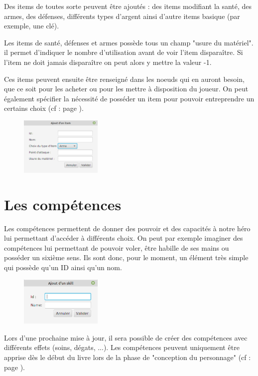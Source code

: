 		Des items de toutes sorte peuvent être ajoutés : des items modifiant la santé, des armes, des défenses, différents types d'argent ainsi d'autre items basique (par exemple, une clé).

		Les items de santé, défenses et armes possède tous un champ "usure du matériel". il permet d'indiquer le nombre d'utilisation avant de voir l'item disparaître. Si l'item ne doit jamais disparaître on peut alors y mettre la valeur -1.

		Ces items peuvent ensuite être renseigné dans les noeuds qui en auront besoin, que ce soit pour les acheter ou pour les mettre à disposition du joueur. On peut également spécifier la nécessité de posséder un item pour pouvoir entreprendre un certains choix (cf :  page \pageref{sec:prerequis}).

		\begin{figure}[H]
			\centering\includegraphics[width=0.35\textwidth, keepaspectratio]{img/itemDialog.png}
		\end{figure}

	\section{Les compétences}
		\label{sec:skills}

		Les compétences permettent de donner des pouvoir et des capacités à notre héro lui permettant d'accéder à différents choix. On peut par exemple imaginer des compétences lui permettant de pouvoir voler, être habille de ses mains ou posséder un sixième sens. Ils sont donc, pour le moment, un élément très simple qui possède qu'un ID ainsi qu'un nom.

		\begin{figure}[H]
			\centering\includegraphics[width=0.35\textwidth, keepaspectratio]{img/skillDialog.png}
		\end{figure}

		Lors d'une prochaine mise à jour, il sera possible de créer des compétences avec différents effets (soins, dégats, ...). Les compétences peuvent uniquement être apprise dès le début du livre lors de la phase de "conception du personnage" (cf :   page \pageref{subsubsec:persoCreationSkill}).
